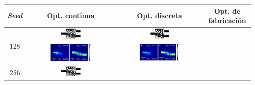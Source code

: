\begin{landscape}
\begin{table}[ht]
    \centering
    \vspace*{-2.5cm}
    \hspace*{-5cm}
    \begin{tabular}{|c|c|c|c|}
    \hline 
    \emph{Seed} & Opt. continua & Opt. discreta &  Opt. de fabricación \\
    \hline
      \multirow{2}{*}{128} &
      \includegraphics[width=0.24\textwidth]{image/results/wdm/PSO/visualize_eps_cont_128.png} &
      \includegraphics[width=0.24\textwidth]{image/results/wdm/PSO/visualize_eps_disc_128.png} \\
      \cline{2-4}
      &
      \includegraphics[width=0.50\textwidth]{image/results/wdm/PSO/visualize_field_cont_128.png} &
      \includegraphics[width=0.50\textwidth]{image/results/wdm/PSO/visualize_field_disc_128.png} \\
      \multirow{2}{*}{256} &
      \includegraphics[width=0.24\textwidth]{image/results/wdm/PSO/visualize_eps_cont_256.png} &

\end{tabular}
\end{table}
\end{landscape}

